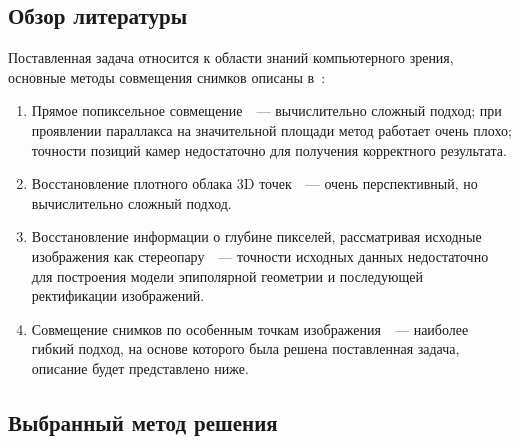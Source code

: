 \documentclass[a4paper,12pt]{article}
\begin{document}
\subsection{Обзор литературы}
Поставленная задача относится к области знаний компьютерного зрения, 
основные методы совмещения снимков описаны 
в~\cite{zitova03is-survey, szelisky06alignstichtut, szelisky10compvis}:
\begin{enumerate}
  \item Прямое попиксельное совмещение~\cite{bergen92hmbme}~--- 
  вычислительно сложный подход; 
  при проявлении параллакса на значительной площади метод работает очень плохо;
  точности позиций камер недостаточно для получения корректного
  результата.
  \item Восстановление плотного облака 3D точек~\cite{furu09mvs}~--- очень перспективный, 
  но вычислительно сложный подход.
  \item Восстановление информации о глубине пикселей, рассматривая исходные
  изображения как стереопару~\cite{scharstein02taxonomy}~--- 
  точности исходных данных недостаточно для построения модели эпиполярной 
  геометрии и последующей ректификации изображений.
  \item Совмещение снимков по особенным точкам изображения~\cite{cham98matchframework, brown03recognising, mclauchlan02mosaic}~--- 
  наиболее гибкий подход, на основе которого была решена поставленная задача, 
  описание будет представлено ниже.
\end{enumerate}



\subsection{Выбранный метод решения}

\newcommand{\drawcross}[2]{
    \draw[#1] #2 -- +(+0.1, +0.1);
    \draw[#1] #2 -- +(-0.1, +0.1);
    \draw[#1] #2 -- +(-0.1, -0.1);
    \draw[#1] #2 -- +(+0.1, -0.1);
}
\end{document}
